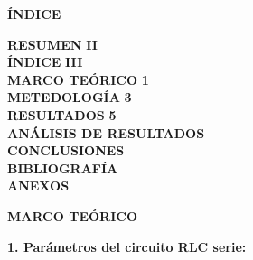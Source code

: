 \documentclass[12pt]{article}
\begin{document}
    \newpage
    
    \begin{center}
        \textbf{\large ÍNDICE}\\
    \end{center}
    
    \noindent \textbf{RESUMEN} \hfill \textbf{II}\\
    \noindent \textbf{ÍNDICE} \hfill \textbf{III}\\
    \noindent \textbf{MARCO TEÓRICO} \hfill \textbf{1}\\
    \noindent \textbf{METEDOLOGÍA} \hfill \textbf{3}\\
    \noindent \textbf{RESULTADOS} \hfill \textbf{5}\\
    \noindent \textbf{ANÁLISIS DE RESULTADOS} \hfill \textbf{}\\
    \noindent \textbf{CONCLUSIONES} \hfill \textbf{}\\
    \noindent \textbf{BIBLIOGRAFÍA} \hfill \textbf{}\\
    \noindent \textbf{ANEXOS} \hfill \textbf{}\\
    
    \newpage
    
    
    \begin{center}
        \textbf{\large MARCO TEÓRICO}\\
    \end{center}

    \textbf{1. Parámetros del circuito RLC serie:}
\end{document}
